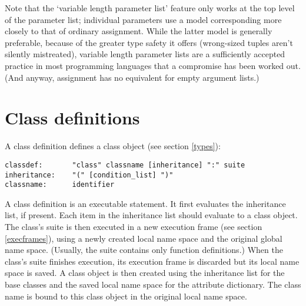 Note that the `variable length parameter list' feature only works at
the top level of the parameter list; individual parameters use a model
corresponding more closely to that of ordinary assignment.  While the
latter model is generally preferable, because of the greater type
safety it offers (wrong-sized tuples aren't silently mistreated),
variable length parameter lists are a sufficiently accepted practice
in most programming languages that a compromise has been worked out.
(And anyway, assignment has no equivalent for empty argument lists.)

\section{Class definitions} \label{class}

A class definition defines a class object (see section \ref{types}):

\begin{verbatim}
classdef:       "class" classname [inheritance] ":" suite
inheritance:    "(" [condition_list] ")"
classname:      identifier
\end{verbatim}

A class definition is an executable statement.  It first evaluates the
inheritance list, if present.  Each item in the inheritance list
should evaluate to a class object.  The class's suite is then executed
in a new execution frame (see section \ref{execframes}), using a newly
created local name space and the original global name space.
(Usually, the suite contains only function definitions.)  When the
class's suite finishes execution, its execution frame is discarded but
its local name space is saved.  A class object is then created using
the inheritance list for the base classes and the saved local name
space for the attribute dictionary.  The class name is bound to this
class object in the original local name space.
